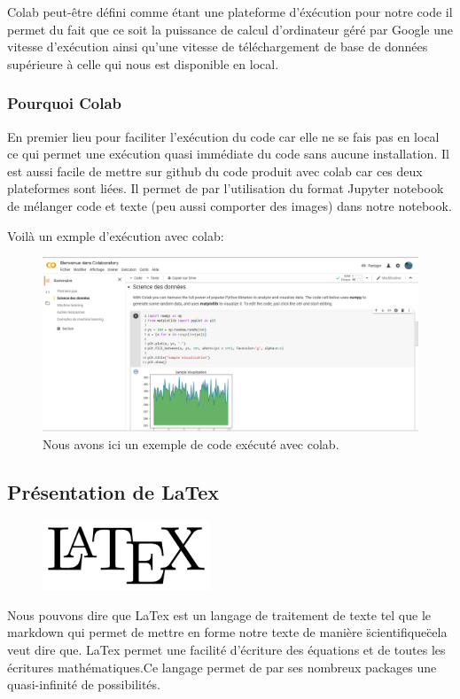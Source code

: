 Colab peut-être défini comme étant une plateforme d'éxécution pour notre code
il permet du fait que ce soit la puissance de calcul d'ordinateur géré par Google une vitesse d'exécution ainsi qu'une vitesse de téléchargement de base de données supérieure à celle qui nous est disponible en local.

\hypertarget{Pourquoi-Colab}{%
\subsubsection{Pourquoi Colab}
\label{Pourquoi-Colab}}
En premier lieu pour faciliter l'exécution du code car elle ne se fais pas en local ce qui permet une exécution quasi immédiate du code sans aucune installation. Il est aussi facile de mettre sur github du code produit avec colab car ces deux plateformes sont liées. Il permet de par l'utilisation du format Jupyter notebook de mélanger code et texte (peu aussi comporter des images) dans notre notebook.

Voilà un exmple d'exécution avec colab:

\begin{figure}[h]
\begin{center}
\includegraphics[width=15cm]{./images/Cap_colab.PNG}
\caption{Nous avons ici un exemple de code exécuté avec colab.}
\end{center}
\end{figure}


\hypertarget{Pruxe9sentation-de-LaTex}{%
\subsection{Présentation de LaTex}
\label{Pruxe9sentation-de-LaTex}}

\begin{figure}[h]
  \begin{center}
\includegraphics[width=5cm]{./images/Latex.png}
\end{center}
\end{figure}

Nous pouvons dire que LaTex est un langage de traitement de texte tel que le markdown qui permet de mettre en forme notre texte de manière \"scientifique\" cela veut dire que. LaTex permet une facilité d'écriture des équations et de toutes les écritures mathématiques.Ce langage permet de par ses nombreux packages une quasi-infinité de possibilités.
